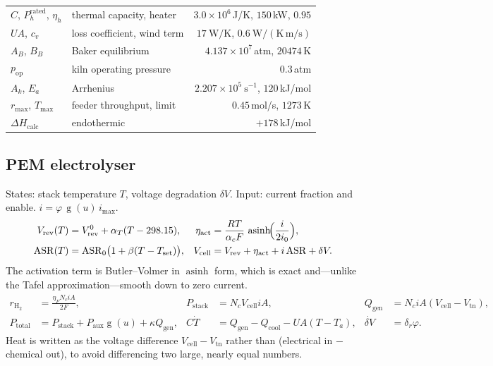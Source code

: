 \documentclass[11pt,a4paper]{article}
\newcommand{\gate}{\operatorname{g}}
\begin{document}
\begin{center}\small
\begin{tabular}{llr}
\toprule
$C$, $P_h^{\text{rated}}$, $\eta_h$ & thermal capacity, heater & $3.0\times10^6$\,J/K, $150$\,kW, $0.95$\\
$UA$, $c_v$ & loss coefficient, wind term & $17\ \mathrm{W/K}$, $0.6\ \mathrm{W/(K\,m/s)}$\\
$A_B$, $B_B$ & Baker equilibrium & $4.137\times10^7$\,atm, $20474$\,K\\
$p_{\text{op}}$ & kiln operating pressure & $0.3$\,atm\\
$A_k$, $E_a$ & Arrhenius & $2.207\times10^5\ \mathrm{s^{-1}}$, $120$\,kJ/mol\\
$r_{\max}$, $T_{\max}$ & feeder throughput, limit & $0.45$\,mol/s, $1273$\,K\\
$\Delta H_{\text{calc}}$ & endothermic & $+178$\,kJ/mol\\
\bottomrule
\end{tabular}
\end{center}

\subsection{PEM electrolyser}

States: stack temperature $T$, voltage degradation $\delta V$. Input: current
fraction and enable. $i = \varphi\,\gate(u)\,i_{\max}$.
\begin{align}
V_{\text{rev}}(T) &= V_{\text{rev}}^0 + \alpha_T (T-298.15), &
\eta_{\text{act}} &= \frac{RT}{\alpha_c F}\,\operatorname{asinh}\!\Bigl(\frac{i}{2i_0}\Bigr),\\
\mathrm{ASR}(T) &= \mathrm{ASR}_0\bigl(1+\beta(T-T_{\text{set}})\bigr), &
V_{\text{cell}} &= V_{\text{rev}} + \eta_{\text{act}} + i\,\mathrm{ASR} + \delta V .
\end{align}
The activation term is Butler--Volmer in $\operatorname{asinh}$ form, which is
exact and---unlike the Tafel approximation---smooth down to zero current.
\begin{align}
r_{\mathrm{H_2}} &= \frac{\eta_F N_c i A}{2F}, &
P_{\text{stack}} &= N_c V_{\text{cell}} i A, &
Q_{\text{gen}} &= N_c i A (V_{\text{cell}} - V_{\text{tn}}),\\
P_{\text{total}} &= P_{\text{stack}} + P_{\text{aux}}\gate(u) + \kappa Q_{\text{gen}}, &
C\dot T &= Q_{\text{gen}} - Q_{\text{cool}} - UA(T-T_a), &
\dot{\delta V} &= \delta_r \varphi .
\end{align}
Heat is written as the voltage difference $V_{\text{cell}}-V_{\text{tn}}$ rather
than (electrical in $-$ chemical out), to avoid differencing two large, nearly
equal numbers.
\end{document}
